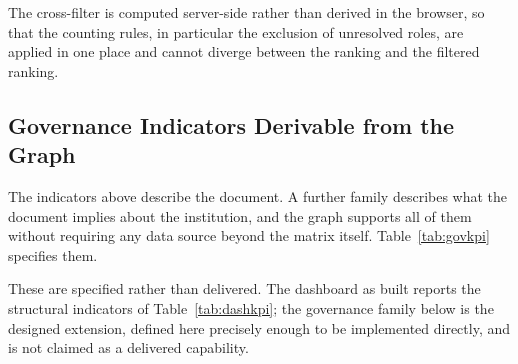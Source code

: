 The cross-filter is computed server-side rather than derived in the browser, so that the
counting rules, in particular the exclusion of unresolved roles, are applied in one place
and cannot diverge between the ranking and the filtered ranking.

\subsection{Governance Indicators Derivable from the Graph}
\label{sec:govkpi}

The indicators above describe the document. A further family describes what the document
implies about the institution, and the graph supports all of them without requiring any
data source beyond the matrix itself. Table~\ref{tab:govkpi} specifies them.

These are specified rather than delivered. The dashboard as built reports the structural
indicators of Table~\ref{tab:dashkpi}; the governance family below is the designed
extension, defined here precisely enough to be implemented directly, and is not claimed as
a delivered capability.

